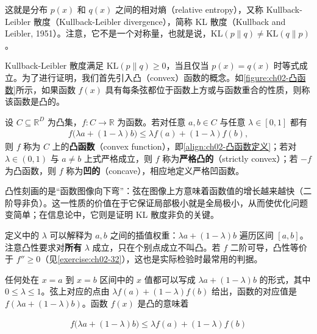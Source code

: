 \documentclass[../../main.tex]{subfiles}
\begin{document}
这就是分布 $p(x)$ 和 $q(x)$ 之间的相对熵（relative entropy），又称 Kullback-Leibler 散度（Kullback-Leibler divergence），简称 KL 散度（Kullback and Leibler, 1951）。注意，它不是一个对称量，也就是说，$\mathrm{KL}(p\|q)\neq\mathrm{KL}(q\|p)$。

Kullback-Leibler 散度满足 $\mathrm{KL}(p\|q)\geqslant0$，当且仅当 $p(x)=q(x)$ 时等式成立。为了进行证明，我们首先引入凸（convex）函数的概念。如\cref{figure:ch02-凸函数}所示，如果函数 $f(x)$ 具有每条弦都位于函数上方或与函数重合的性质，则称该函数是凸的。

\begin{definition}[凸函数与凹函数]\label{definition:ch02-凸函数}
设 $C\subseteq\mathbb{R}^{D}$ 为凸集，$f:C\to\mathbb{R}$ 为函数。若对任意 $a,b\in C$ 与任意 $\lambda\in[0,1]$ 都有
\begin{align*}
  f\big(\lambda a+(1-\lambda)b\big)\leqslant\lambda f(a)+(1-\lambda)f(b),
\end{align*}
则 $f$ 称为 $C$ 上的\textbf{凸函数}（convex function），即\eqref{align:ch02-凸函数定义}；若对 $\lambda\in(0,1)$ 与 $a\neq b$ 上式严格成立，则 $f$ 称为\textbf{严格凸的}（strictly convex）；若 $-f$ 为凸函数，则 $f$ 称为\textbf{凹的}（concave），相应地定义严格凹函数。
\end{definition}

\begin{remark}
凸性刻画的是“函数图像向下弯”：弦在图像上方意味着函数值的增长越来越快（二阶导非负）。这一性质的价值在于它保证局部极小就是全局极小，从而使优化问题变简单；在信息论中，它则是证明 KL 散度非负的关键。

定义中的 $\lambda$ 可以解释为 $a,b$ 之间的插值权重：$\lambda a+(1-\lambda)b$ 遍历区间 $[a,b]$。注意凸性要求对\textbf{所有} $\lambda$ 成立，只在个别点成立不叫凸。若 $f$ 二阶可导，凸性等价于 $f''\geqslant0$（见\cref{exercise:ch02-32}），这也是实际检验时最常用的判据。
\end{remark}

任何处在 $x=a$ 到 $x=b$ 区间中的 $x$ 值都可以写成 $\lambda a+(1-\lambda)b$ 的形式，其中 $0\leqslant\lambda\leqslant1$。弦上对应的点由 $\lambda f(a)+(1-\lambda)f(b)$ 给出，函数的对应值是 $f(\lambda a+(1-\lambda)b)$。函数 $f(x)$ 是凸的意味着

\begin{align}
  f\big(\lambda a+(1-\lambda)b\big) \leqslant \lambda f(a)+(1-\lambda)f(b)
  \label{align:ch02-凸函数定义}
\end{align}
\end{document}
